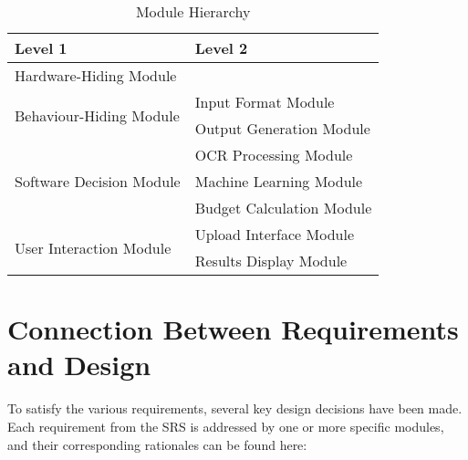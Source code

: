\documentclass[12pt, titlepage]{article}
\begin{document}
\begin{table}[h!]
\centering
\begin{tabular}{p{} p{}}
\toprule
\textbf{Level 1} & \textbf{Level 2}\\
\midrule

{Hardware-Hiding Module} & ~ \\
\midrule

\multirow{2}{0.3\textwidth}{Behaviour-Hiding Module} & Input Format Module\\
& Output Generation Module\\
\midrule

\multirow{3}{0.3\textwidth}{Software Decision Module} & {OCR Processing Module}\\
& Machine Learning Module\\
& Budget Calculation Module\\
\midrule

\multirow{2}{0.3\textwidth}{User Interaction Module} & {Upload Interface Module}\\
& Results Display Module\\
\bottomrule

\end{tabular}
\caption{Module Hierarchy}
\label{TblMH}
\end{table}

\section{Connection Between Requirements and Design} \label{SecConnection}



To satisfy the various requirements, several key design decisions have been made. Each requirement from the SRS is addressed by one or more specific modules, and their corresponding rationales can be found here:
\end{document}
